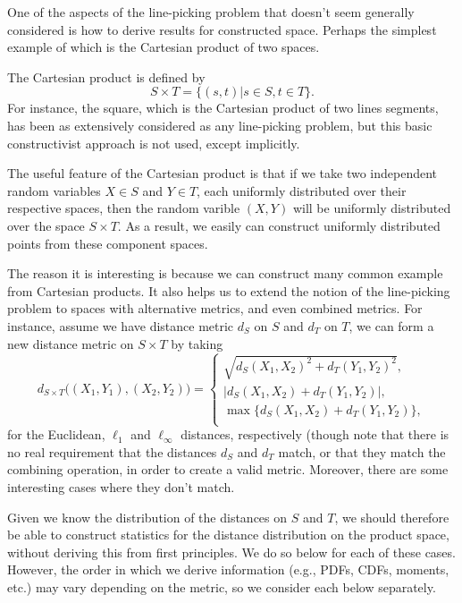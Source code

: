 \documentclass{article}
\begin{document}
One of the aspects of the line-picking problem that doesn't seem
generally considered is how to derive results for constructed
space. Perhaps the simplest example of which is the Cartesian product
of two spaces.

The Cartesian product is defined by
\begin{equation}
 S \times T = \{ (s,t) | s \in S, t \in T \}. 
\end{equation}
For instance, the square, which is the Cartesian product of two lines
segments, has been as extensively considered as any line-picking
problem, but this basic constructivist approach is not used, except
implicitly. 

The useful feature of the Cartesian product is that if we take two
independent random variables $X \in S$ and $Y \in T$, each uniformly
distributed over their respective spaces, then the random varible
$(X,Y)$ will be uniformly distributed over the space $S \times T$. As
a result, we easily can construct uniformly distributed points from
these component spaces. 

The reason it is interesting is because we can construct many common
example from Cartesian products. It also helps us to extend the notion
of the line-picking problem to spaces with alternative metrics, and
even combined metrics. For instance, assume we have distance metric
$d_S$ on $S$ and $d_T$ on $T$, we can form a new distance metric on $S
\times T$ by taking
\begin{equation}
  d_{S \times T}\Big( (X_1,Y_1), (X_2,Y_2)  \Big)
 = \left\{ \begin{array}{ll}
      \sqrt{ d_S(X_1,X_2)^2 +  d_T(Y_1,Y_2)^2}, \\
      | d_S(X_1,X_2) +  d_T(Y_1,Y_2)|, \\
      \max\{ d_S(X_1,X_2) +  d_T(Y_1,Y_2) \}, \\
    \end{array}
  \right.
\end{equation}
for the Euclidean, $\ell_1$ and $\ell_{\infty}$ distances,
respectively (though note that there is no real requirement that the
distances $d_S$ and $d_T$ match, or that they match the combining
operation, in order to create a valid metric. Moreover, there are some
interesting cases where they don't match.

Given we know the distribution of the distances on $S$ and $T$, we
should therefore be able to construct statistics for the distance
distribution on the product space, without deriving this from first
principles. We do so below for each of these cases. However, the order
in which we derive information (e.g., PDFs, CDFs, moments, etc.) may
vary depending on the metric, so we consider each below separately. 
\end{document}
